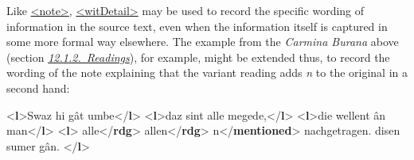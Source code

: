 Like \hyperref[TEI.note]{<note>}, \hyperref[TEI.witDetail]{<witDetail>} may be used to record the specific wording of information in the source text, even when the information itself is captured in some more formal way elsewhere. The example from the \textit{Carmina Burana} above (section \textit{\hyperref[TCAPLR]{12.1.2.\ Readings}}), for example, might be extended thus, to record the wording of the note explaining that the variant reading adds \textit{n} to the original in a second hand: \par\bgroup{}\exampleFont \begin{shaded}\noindent\mbox{}{<\textbf{l}>}Swaz hi gât umbe{</\textbf{l}>}\mbox{}\newline 
{<\textbf{l}>}daz sint alle megede,{</\textbf{l}>}\mbox{}\newline 
{<\textbf{l}>}die wellent ân man{</\textbf{l}>}\mbox{}\newline 
{<\textbf{l}>}\mbox{}\newline 
{}\mbox{}\newline 
\hspace*{1em}alle{</\textbf{rdg}>}\mbox{}\newline 
\hspace*{1em}allen{</\textbf{rdg}>}\mbox{}\newline 
\hspace*{1em}\mbox{}\newline 
\hspace*{1em}\hspace*{1em}n{</\textbf{mentioned}>} nachgetragen.\mbox{}\newline 
\hspace*{1em}\mbox{}\newline 
{}\mbox{}\newline 
 disen sumer gân.\mbox{}\newline 
{</\textbf{l}>}\end{shaded}\egroup\par \noindent    \par
